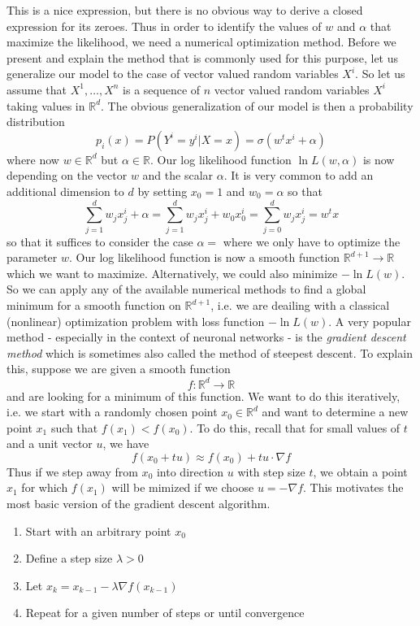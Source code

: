 \documentclass[a4paper, draft]{report}
\numberwithin{section}{chapter}
\numberwithin{equation}{chapter}
\theoremstyle{own}
\theoremstyle{remark}
\newcommand{\R}{\mathbb{R}}
\begin{document}
This is a nice expression, but there is no obvious way to derive a closed expression for its zeroes. Thus in order to identify the values of $w$ and $\alpha$ that maximize the likelihood, we need a numerical optimization method. Before we present and explain the method that is commonly used for this purpose, let us generalize our model to the case of vector valued random variables $X^i$. So let us assume that $X^1, \dots, X^n$ is a sequence of $n$ vector valued random variables $X^i$ taking values in $\R^d$. The obvious generalization of our model is then a probability distribution
$$
p_i (x) = P(Y^i = y^i | X = x) = \sigma(w^t x^i + \alpha)
$$
where now $w \in \R^d$ but $\alpha \in \R$. Our log likelihood function $\ln L(w, \alpha)$ is now depending on the vector $w$ and the scalar $\alpha$. It is very common to add an additional dimension to $d$ by setting $x_0 = 1$ and $w_0 = \alpha$ so that 
$$
\sum_{j=1}^d w_j  x_j^i + \alpha = \sum_{j=1}^d w_j  x_j^i + w_0 x_0^i =\sum_{j=0}^d w_j x_j^i = w^t x
$$
so that it suffices to consider the case $\alpha = $ where we only have to optimize the parameter $w$. Our log likelihood function is now a smooth function $\R^{d+1} \rightarrow \R$ which we want to maximize. Alternatively, we could also minimize $- \ln L(w)$. So we can apply any of the available numerical methods to find a global minimum for a smooth function on $\R^{d+1}$, i.e. we are deailing with a classical (nonlinear) optimization problem with  loss function $- \ln L(w)$. A very popular method - especially in the context of neuronal networks - is the {\em gradient descent method} which is sometimes also called the method of steepest descent. To explain this, suppose we are given a smooth function 
$$
f \colon \R^d \rightarrow \R
$$
and are looking for a minimum of this function. We want to do this iteratively, i.e. we start with a randomly chosen point $x_0 \in \R^d$ and want to determine a new point $x_1$ such that $f(x_1) < f(x_0)$. To do this, recall that for small values of $t$ and a unit vector $u$, we have
$$
f(x_0 + tu) \approx f(x_0) + t u \cdot \nabla f
$$
Thus if we step away from $x_0$ into direction $u$ with step size $t$, we obtain a point $x_1$ for which $f(x_1)$ will be mimized if we choose $u = - \nabla f$. This motivates the most basic version of the gradient descent algorithm.

\begin{enumerate}
\item Start with an arbitrary point $x_0$
\item Define a step size $\lambda > 0$
\item Let $x_k = x_{k-1} - \lambda \nabla f (x_{k-1})$
\item Repeat for a given number of steps or until convergence
\end{enumerate}
\end{document}
